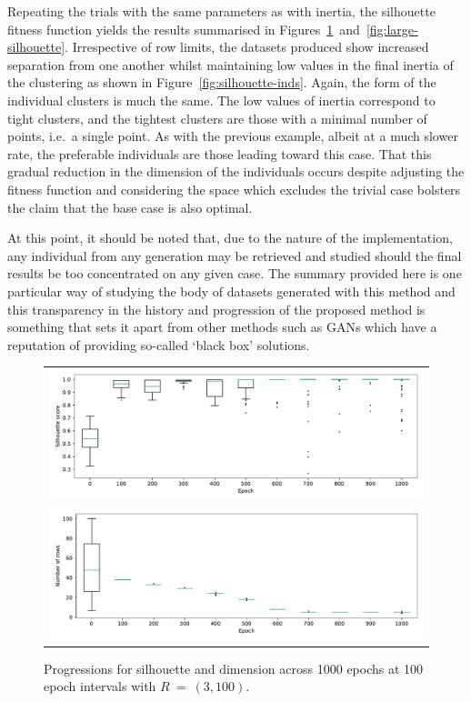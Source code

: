 \documentclass[smallextended]{svjour3}
\newlength{\imgwidth}
\begin{document}
Repeating the trials with the same parameters as with inertia, the silhouette
fitness function yields the results summarised in
Figures~\ref{fig:small-silhouette}~and~\ref{fig:large-silhouette}. Irrespective
of row limits, the datasets produced show increased separation from one another
whilst maintaining low values in the final inertia of the clustering as shown in
Figure~\ref{fig:silhouette-inds}. Again, the form of the individual clusters is
much the same. The low values of inertia correspond to tight clusters, and the
tightest clusters are those with a minimal number of points, i.e.\ a single
point. As with the previous example, albeit at a much slower rate, the
preferable individuals are those leading toward this case. That this gradual
reduction in the dimension of the individuals occurs despite adjusting the
fitness function and considering the space which excludes the trivial case
bolsters the claim that the base case is also optimal.

At this point, it should be noted that, due to the nature of the implementation,
any individual from any generation may be retrieved and studied should the final
results be too concentrated on any given case. The summary provided here is one
particular way of studying the body of datasets generated with this method and
this transparency in the history and progression of the proposed method is
something that sets it apart from other methods such as GANs which have a
reputation of providing so-called `black box' solutions.

\addtocounter{figure}{1}
\begin{figure}[htbp]
    \ContinuedFloat%
    \centering
    \begin{tabular}{c}
        \includegraphics[width=\imgwidth]{Fig9a-1.pdf}
        \\
        \includegraphics[width=\imgwidth]{Fig9a-2.pdf}
    \end{tabular}
    \caption{%
        Progressions for silhouette and dimension across 1000 epochs at 100
        epoch intervals with \(R~=~(3, 100)\).
    }\label{fig:small-silhouette}
\end{figure}
\end{document}
